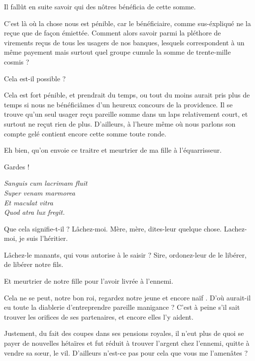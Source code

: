 \begin{drama}
  \roispeaks Il fallût en suite savoir qui des nôtres bénéficia de cette somme.

  \impositeurspeaks C’est là où la chose nous est pénible, car le bénéficiaire, comme sus-éxpliqué ne la reçue que de façon émiettée. Comment alors savoir parmi la pléthore de virements reçus de tous les usagers de nos banques, lesquels correspondent à un même payement mais surtout quel groupe cumule la somme de trente-mille cosmis ?

  \roispeaks Cela est-il possible ?

  \impositeurspeaks Cela est fort pénible, et prendrait du temps, ou tout du moins aurait pris plus de temps si nous ne bénéficiâmes d’un heureux concours de la providence. Il se trouve qu’un seul usager reçu pareille somme dans un laps relativement court, et surtout ne reçut rien de plus. D’ailleurs, à l’heure même où nous parlons son compte gelé contient encore cette somme toute ronde.

  \reinespeaks Eh bien, qu’on envoie ce traitre et meurtrier de ma fille à l’équarrisseur.

  \roispeaks Gardes !


  \choirspeaks
  \begin{minipage}[t]{\linewidth}
    \em
    Sanguis cum lacrimam fluit\endnote{\lacrimamendnote}\\
    Super venam marmorea\\
    Et maculat vitra\\
    Quod atra lux fregit.
  \end{minipage}

  \vladimirspeaks Que cela signifie-t-il ? Lâchez-moi.  Mère, mère, dites-leur quelque chose. Lachez-moi, je suis l’héritier.


  \reinespeaks {} Lâchez-le manants, qui vous autorise à le saisir ?  Sire, ordonez-leur de le libérer, de libérer notre fils.

  \roispeaks Et meurtrier de notre fille pour l’avoir livrée à l’ennemi.

  \reinespeaks Cela ne se peut, notre bon roi, regardez notre jeune et encore naïf \vladimir{}. D’où aurait-il eu toute la diablerie d’entreprendre pareille manigance ? C’est à peine s’il sait trouver les orifices de ses partenaires, et encore elles l’y aident.

  \roispeaks Justement, du fait des coupes dans ses pensions royales, il n’eut plus de quoi se payer de nouvelles hétaïres et fut réduit à trouver l’argent chez l’ennemi, quitte à vendre sa sœur, le vil. D’ailleurs n’est-ce pas pour cela que vous me l’amenâtes ?


\end{drama}
